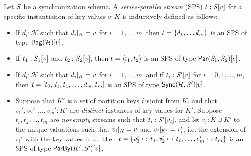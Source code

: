 \begin{definition}
\label{45:def:trace}
Let $\ss$ be a synchronization schema.
A \emph{series-parallel stream} (SPS) $t : \spstype{v}{\ss}$ for a specific instantiation of key values $v : K$ is inductively defined as follows:
\begin{itemize}
\item
If $d_i : \mathcal{H}$ such that $\tuprestrict{d_i}{K} = v$
for $i = 1, \ldots, m$,
then $t = \spsbag{d_1, \ldots d_m}$
is an SPS of type $\spstype{v}{\relleaf{\mathcal{H}}}$.
\item
If $t_1 : \spstype{v}{S_1}$
and $t_2 : \spstype{v}{S_2}$,
then $t = \spspar{t_1}{t_2}$
is an SPS of type $\spstype{v}{\parcomp{S_1}{S_2}}$.
\item
If $d_i : \mathcal{H}$ such that $\tuprestrict{d_i}{K} = v$
for $i = 1, \ldots, m$,
and if $t_i: \spstype{v}{S'}$ for $i = 0, 1, \ldots, m$,
then
$t = \spsseq{t_0, d_1, t_1, \ldots, d_m, t_m}$
is an SPS of type $\spstype{v}{\hier{\mathcal{H}}{S'}}$.
\item
Suppose that $K'$ is a set of partition keys disjoint from $K$,
and that $v_1', v_2', \ldots, v_m': K'$ are \emph{distinct} instances
of key values for $K'$.
Suppose $t_1, t_2, \ldots, t_m$ are \emph{nonempty} streams such that
$t_i: \spstype{v_i}{S'}$,
and let $v_i: K \cup K'$ to the unique valuations
such that $\tuprestrict{v_i}{K} = v$ and $\tuprestrict{v_i}{K'} = v_i'$,
i.e. the extension of $v_i'$ with the key values in $v$.
Then
$t = \spsbag{\keyed{v_1'}{t_1}, \keyed{v_2'}{t_2}, \ldots, \keyed{v_m'}{t_m}}$
is an SPS of type
$\spstype{v}{\keyby{K'}{S'}}$.
\end{itemize}
\end{definition}




